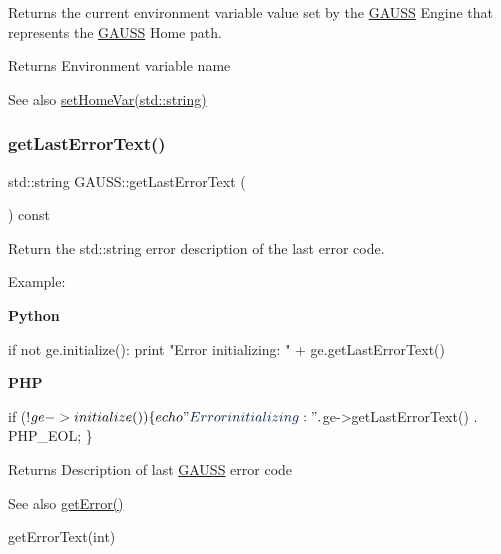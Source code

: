 Returns the current environment variable value set by the \hyperlink{class_g_a_u_s_s}{G\+A\+U\+SS} Engine that represents the \hyperlink{class_g_a_u_s_s}{G\+A\+U\+SS} Home path. 

\begin{DoxyReturn}{Returns}
Environment variable name
\end{DoxyReturn}
\begin{DoxySeeAlso}{See also}
\hyperlink{class_g_a_u_s_s_ad2935b18b45d55903bb5025143dffab4}{set\+Home\+Var(std\+::string)} 
\end{DoxySeeAlso}
\mbox{\label{class_g_a_u_s_s_a4d8c56b05b0878aa3831ba465c409235}} 
\subsubsection{\texorpdfstring{get\+Last\+Error\+Text()}{getLastErrorText()}}
{\footnotesize\ttfamily std\+::string G\+A\+U\+S\+S\+::get\+Last\+Error\+Text (\begin{DoxyParamCaption}{ }\end{DoxyParamCaption}) const}



Return the std\+::string error description of the last error code. 

Example\+:

{\bfseries Python} 
\begin{DoxyCode}
\textcolor{keywordflow}{if} \textcolor{keywordflow}{not} ge.initialize():
    \textcolor{keywordflow}{print} \textcolor{stringliteral}{"Error initializing: "} + ge.getLastErrorText()
\end{DoxyCode}


{\bfseries P\+HP} 
\begin{DoxyCode}
\textcolor{keywordflow}{if} (!$ge->initialize()) \{
    echo \textcolor{stringliteral}{"Error initializing: "} . $ge->getLastErrorText() . PHP\_EOL;
\}
\end{DoxyCode}


\begin{DoxyReturn}{Returns}
Description of last \hyperlink{class_g_a_u_s_s}{G\+A\+U\+SS} error code
\end{DoxyReturn}
\begin{DoxySeeAlso}{See also}
\hyperlink{class_g_a_u_s_s_a214b7c251ff80099c04a49e5b5032926}{get\+Error()} 

get\+Error\+Text(int) 
\end{DoxySeeAlso}
\mbox{\label{class_g_a_u_s_s_a41c57746753165bfc8b2e71459c6ccde}} 
